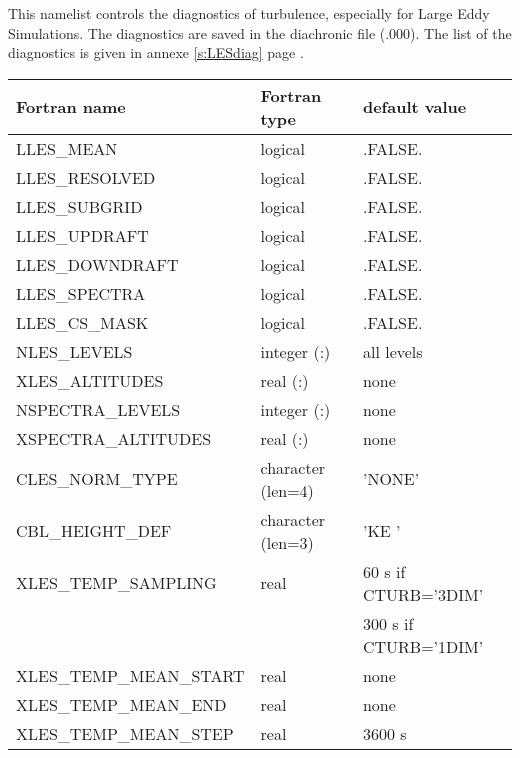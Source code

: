 This namelist controls the diagnostics of turbulence, especially
for Large Eddy Simulations. The diagnostics are saved in the
diachronic file (.000). The list of the diagnostics is given in annexe \ref{s:LESdiag} page  \pageref{s:LESdiag}.

\begin{center}
\begin{tabular} {|l|l|l|}
\hline
Fortran name & Fortran type & default value \\
\hline
LLES\_MEAN                    &  logical          & .FALSE.  \\
LLES\_RESOLVED                &  logical          & .FALSE.  \\
LLES\_SUBGRID                 &  logical          & .FALSE.  \\
LLES\_UPDRAFT                 &  logical          & .FALSE.  \\
LLES\_DOWNDRAFT               &  logical          & .FALSE.  \\
LLES\_SPECTRA                 &  logical          & .FALSE.  \\
LLES\_CS\_MASK                &  logical          & .FALSE.  \\
NLES\_LEVELS                  & integer (:)       & all levels\\
XLES\_ALTITUDES               & real (:)          & none \\
NSPECTRA\_LEVELS              & integer (:)   & none \\
XSPECTRA\_ALTITUDES           & real (:)   & none \\
CLES\_NORM\_TYPE              & character (len=4) & 'NONE' \\
CBL\_HEIGHT\_DEF              & character (len=3) & 'KE ' \\
XLES\_TEMP\_SAMPLING          & real              & 60 s if CTURB='3DIM' \\
                              &                   & 300 s if CTURB='1DIM' \\
XLES\_TEMP\_MEAN\_START       & real              & none \\
XLES\_TEMP\_MEAN\_END         & real              & none \\
XLES\_TEMP\_MEAN\_STEP        & real              & 3600 s \\

\end{tabular}
\end{center}
